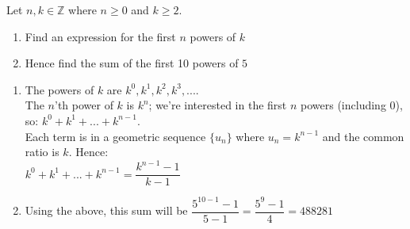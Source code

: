 \documentclass[12pt, a4paper, titlepage, twoside]{article}
\newcommand*{\Z}{\mathbb{Z}}
\newcounter{excount}[subsection]
\begin{document}
	\begin{ex}
		Let $n, k \in \Z$ where $n \geqslant 0$ and $k \geqslant 2$.
		\begin{enumerate}[label=\textbf{(\alph*)}]
			\item Find an expression for the first $n$ powers of $k$
			\item Hence find the sum of the first 10 powers of $5$
		\end{enumerate}
		
		\hfill
		\tcbline
		\hfill
		
		\begin{enumerate}[label=\textbf{(\alph*)}]
			\item The powers of $k$ are $k^0, k^1, k^2, k^3, ...$. \\ The $n$'th power of $k$ is $k^n$; we're interested in the
			first $n$ powers (including 0), so: $k^0 + k^1 + ... + k^{n-1}$. \\ 
			
			Each term is in a geometric sequence $\{u_n\}$ where $u_n = k^{n-1}$ and the common ratio is $k$. Hence:\\
			
			$k^0 + k^1 + ... + k^{n-1} = \dfrac{k^{n-1} - 1}{k-1}$\\
			
			\item Using the above, this sum will be $\dfrac{5^{10 -1} - 1}{5-1} = \dfrac{5^9 - 1}{4} = \num{488 281}$
		\end{enumerate}	
		
	\end{ex}
	
	\hfill
	
\end{document}
